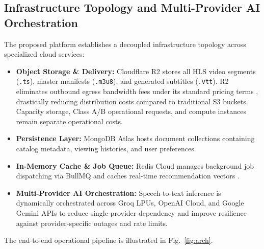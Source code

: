 \documentclass[conference]{IEEEtran}
\begin{document}
\subsection{Infrastructure Topology and Multi-Provider AI Orchestration}
The proposed platform establishes a decoupled infrastructure topology across specialized cloud services:
\begin{itemize}
    \item \textbf{Object Storage \& Delivery:} Cloudflare R2 stores all HLS video segments (\texttt{.ts}), master manifests (\texttt{.m3u8}), and generated subtitles (\texttt{.vtt}). R2 eliminates outbound egress bandwidth fees under its standard pricing terms \cite{b7}, drastically reducing distribution costs compared to traditional S3 buckets. Capacity storage, Class A/B operational requests, and compute instances remain separate operational costs.
    \item \textbf{Persistence Layer:} MongoDB Atlas hosts document collections containing catalog metadata, viewing histories, and user preferences.
    \item \textbf{In-Memory Cache \& Job Queue:} Redis Cloud manages background job dispatching via BullMQ and caches real-time recommendation vectors \cite{b8}.
    \item \textbf{Multi-Provider AI Orchestration:} Speech-to-text inference is dynamically orchestrated across Groq LPUs, OpenAI Cloud, and Google Gemini APIs \cite{b9} to reduce single-provider dependency and improve resilience against provider-specific outages and rate limits.
\end{itemize}

The end-to-end operational pipeline is illustrated in Fig.~\ref{fig:arch}.
\end{document}

